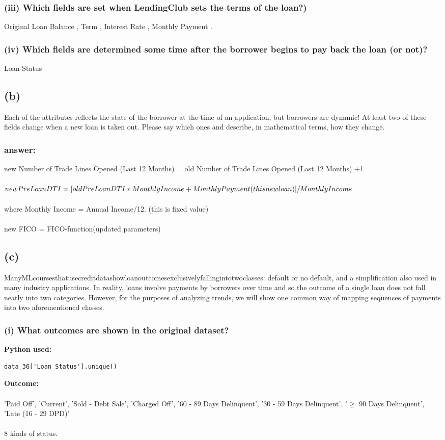 \documentclass{homework}
\begin{document}
\subsubsection*{(iii) Which fields are set when LendingClub sets the terms of the loan?)}
Original Loan Balance , Term  , Interest Rate  , Monthly Payment .
\subsubsection*{(iv) Which fields are determined some time after the borrower begins to pay back the loan (or not)?}
Loan Status  


\subsection*{(b)}
Each of the attributes reflects the state of the borrower at the time of an application, but borrowers are dynamic! At least two of these fields change when a new loan is taken out. Please say which ones and describe, in mathematical terms, how they change.
\subsubsection*{answer:}
new Number of Trade Lines Opened (Last 12 Months)   = old Number of Trade Lines Opened (Last 12 Months)  +1 \\
\\
$new PreLoan DTI  =[old PreLoan DTI * Monthly Income +\\
 Monthly Payment (this new loan)]/Monthly Income$\\
 \\
where Monthly Income = Annual Income/12.   (this is fixed value)\\
\\
new FICO = FICO-function(updated parameters)

\subsection*{(c)}
ManyMLcoursesthatusecreditdatashowloanoutcomesexclusivelyfallingintotwoclasses: default or no default, and a simplification also used in many industry applications. In reality, loans involve payments by borrowers over time and so the outcome of a single loan does not fall neatly into two categories. However, for the purposes of analyzing trends, we will show one common way of mapping sequences of payments into two aforementioned classes.
\subsubsection*{(i) What outcomes are shown in the original dataset?}
\textbf{Python used:}
\begin{verbatim}
data_36['Loan Status'].unique()
\end{verbatim}
\textbf{Outcome:}\\
\\
'Paid Off', 'Current', 'Sold - Debt Sale', 'Charged Off',
       '60 - 89 Days Delinquent', '30 - 59 Days Delinquent',
       '$\geq$ 90 Days Delinquent', 'Late (16 - 29 DPD)'\\
       \\
8 kinds of status.
\end{document}
